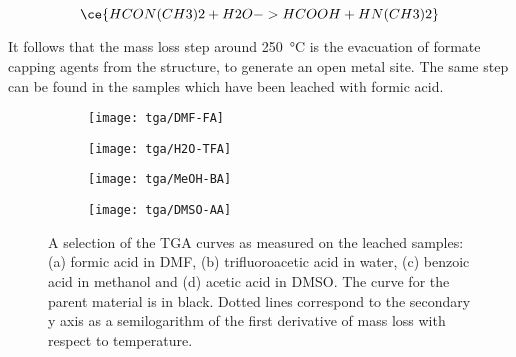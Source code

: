 \begin{equation}\label{def:eqn:dmf-hydrolysis}
    \ce{HCON(CH3)2 + H2O -> HCOOH + HN(CH3)2}
\end{equation}

It follows that the mass loss step around \SI{250}{\degreeCelsius}
is the evacuation of formate capping agents from the 
structure, to generate an open metal site. The same step
can be found in the samples which have been leached with
formic acid.

\begin{figure}[htbp]
    \centering

    \begin{subfigure}{0.45\linewidth}
        \texttt{[image: tga/DMF-FA]}%
		\caption{}%
        \label{def:fgr:tga-dmf-fa}
    \end{subfigure}%
    \begin{subfigure}{0.45\linewidth}
        \texttt{[image: tga/H2O-TFA]}%
		\caption{}%
        \label{def:fgr:tga-h2o-tfa}
    \end{subfigure}%

    
    \begin{subfigure}{0.45\linewidth}
        \texttt{[image: tga/MeOH-BA]}%
		\caption{}%
        \label{def:fgr:tga-meoh-ba}
    \end{subfigure}%
    \begin{subfigure}{0.45\linewidth}
        \texttt{[image: tga/DMSO-AA]}%
		\caption{}%
        \label{def:fgr:tga-dmso-aa}
    \end{subfigure}%

    \caption{A selection of the TGA curves as measured on the
    leached samples: (a) formic acid in DMF, (b) trifluoroacetic
    acid in water, (c) benzoic acid in methanol and (d) acetic acid
    in DMSO. The curve for the parent material is in black. 
    Dotted lines correspond to the secondary y axis as a 
    semilogarithm of the first derivative of mass loss with 
    respect to temperature.}%
    \label{def:fgr:tga-dataset}
\end{figure}

